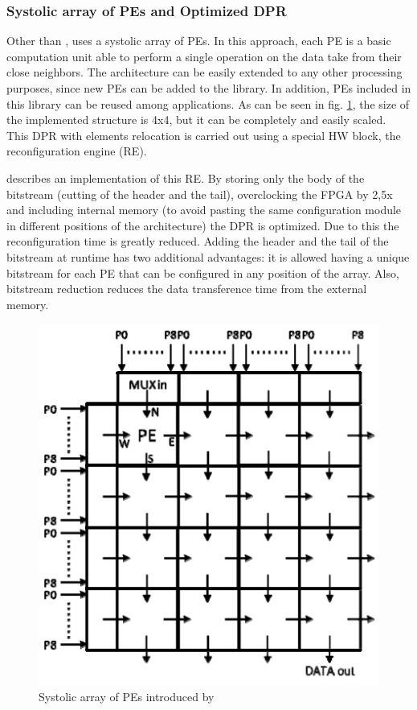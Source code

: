 \subsubsection{Systolic array of PEs and Optimized DPR}
\label{sec:dpr}
Other than \cite{virtex4}, \cite{dpr} uses a systolic array of PEs. In this approach, each PE is a basic computation unit able to perform a single operation on the data take from their close neighbors. The architecture can be easily extended to any other processing purposes, since new PEs can be added to the library. In addition, PEs included in this library can be reused among applications. As can be seen in fig. \ref{fig:pe}, the size of the implemented structure is 4x4, but it can be completely and easily scaled. This DPR with elements relocation is carried out using a special HW block, the reconfiguration engine (RE).

\cite{dpr} describes an implementation of this RE. By storing only the body of the bitstream (cutting of the header and the tail), overclocking the FPGA by 2,5x and including internal memory (to avoid pasting the same configuration module in different positions of the architecture) the DPR is optimized. Due to this the reconfiguration time is greatly reduced. Adding the header and the tail of the bitstream at runtime has two additional advantages: it is allowed having a unique bitstream for each PE that can be configured in any position of the array. Also, bitstream reduction reduces the data transference time from the external memory.

\begin{figure}[htb]%
\includegraphics[width=\columnwidth]{Pictures/PE}%
\caption{Systolic array of PEs introduced by \cite{dpr}}%
\label{fig:pe}%
\end{figure}

